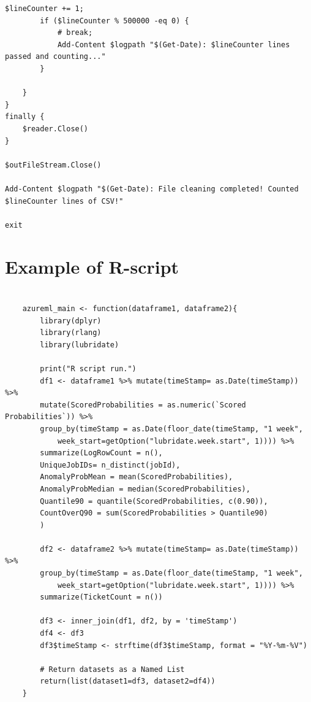 \begin{Verbatim}[fontsize=\tiny]
        $lineCounter += 1;
        if ($lineCounter % 500000 -eq 0) {
            # break;
            Add-Content $logpath "$(Get-Date): $lineCounter lines passed and counting..."
        }

    }
}
finally {
    $reader.Close()
}

$outFileStream.Close()

Add-Content $logpath "$(Get-Date): File cleaning completed! Counted $lineCounter lines of CSV!"

exit

\end{Verbatim}

\clearpage


\section{Example of R-script}\label{sec:app-r-script}



\begin{Verbatim}[fontsize=\small]

    azureml_main <- function(dataframe1, dataframe2){
        library(dplyr)
        library(rlang)
        library(lubridate)

        print("R script run.")
        df1 <- dataframe1 %>% mutate(timeStamp= as.Date(timeStamp)) %>%
        mutate(ScoredProbabilities = as.numeric(`Scored Probabilities`)) %>%
        group_by(timeStamp = as.Date(floor_date(timeStamp, "1 week",
            week_start=getOption("lubridate.week.start", 1)))) %>%
        summarize(LogRowCount = n(),
        UniqueJobIDs= n_distinct(jobId),
        AnomalyProbMean = mean(ScoredProbabilities),
        AnomalyProbMedian = median(ScoredProbabilities),
        Quantile90 = quantile(ScoredProbabilities, c(0.90)),
        CountOverQ90 = sum(ScoredProbabilities > Quantile90)
        )

        df2 <- dataframe2 %>% mutate(timeStamp= as.Date(timeStamp)) %>%
        group_by(timeStamp = as.Date(floor_date(timeStamp, "1 week",
            week_start=getOption("lubridate.week.start", 1)))) %>%
        summarize(TicketCount = n())

        df3 <- inner_join(df1, df2, by = 'timeStamp')
        df4 <- df3
        df3$timeStamp <- strftime(df3$timeStamp, format = "%Y-%m-%V")

        # Return datasets as a Named List
        return(list(dataset1=df3, dataset2=df4))
    }
\end{Verbatim}

\clearpage




